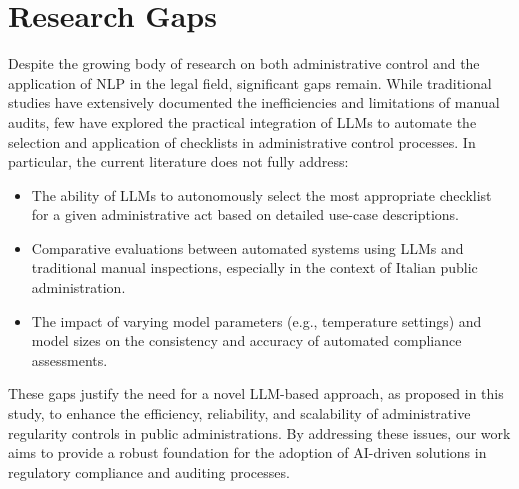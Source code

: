 \documentclass[../main.tex]{subfiles}
\begin{document}
\section*{Research Gaps}
Despite the growing body of research on both administrative control and the application of NLP in the legal field, significant gaps remain. While traditional studies have extensively documented the inefficiencies and limitations of manual audits, few have explored the practical integration of LLMs to automate the selection and application of checklists in administrative control processes. In particular, the current literature does not fully address:
\begin{itemize}
    \item The ability of LLMs to autonomously select the most appropriate checklist for a given administrative act based on detailed use-case descriptions.
    \item Comparative evaluations between automated systems using LLMs and traditional manual inspections, especially in the context of Italian public administration.
    \item The impact of varying model parameters (e.g., temperature settings) and model sizes on the consistency and accuracy of automated compliance assessments.
\end{itemize}
These gaps justify the need for a novel LLM-based approach, as proposed in this study, to enhance the efficiency, reliability, and scalability of administrative regularity controls in public administrations. By addressing these issues, our work aims to provide a robust foundation for the adoption of AI-driven solutions in regulatory compliance and auditing processes.

\ifSubfilesClassLoaded{
    
    
}{}
\end{document}
